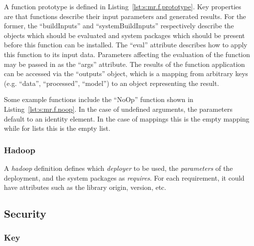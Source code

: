 \documentclass[10pt]{article}
\begin{document}
A function prototype is defined in Listing~\ref{lst:s:mr.f.prototype}.
Key properties are that functions describe their input parameters and
generated results. For the former, the ``buildInputs'' and
``systemBuildInputs'' respectively describe the objects which should
be evaluated and system packages which should be present before this
function can be installed. The ``eval'' attribute describes how to
apply this function to its input data. Parameters affecting the
evaluation of the function may be passed in as the ``args'' attribute.
The results of the function application can be accessed via the
``outputs'' object, which is a mapping from arbitrary keys
(e.g. ``data'', ``processed'', ``model'') to an object representing
the result.



Some example functions include the ``NoOp'' function shown in
Listing~\ref{lst:s:mr.f.noop}.  In the case of undefined arguments,
the parameters default to an identity element. In the case of mappings
this is the empty mapping while for lists this is the empty list.



\subsubsection{Hadoop}

A \textit{hadoop} definition defines which \textit{deployer} to be used,
the \textit{parameters} of the deployment, and the system packages as
\textit{requires}. For each requirement, it could have attributes such
as the library origin, version, etc.



\subsection{Security}

\subsubsection{Key}

\end{document}
